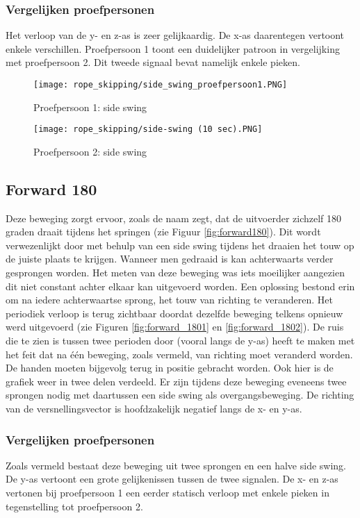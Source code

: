 \subsubsection{Vergelijken proefpersonen}
Het verloop van de y- en z-as is zeer gelijkaardig. De x-as daarentegen vertoont enkele verschillen. Proefpersoon 1 toont een duidelijker patroon in vergelijking met proefpersoon 2. Dit tweede signaal bevat namelijk enkele pieken.

\begin{figure}[!htpd]
\centering
\caption{Proefpersoon 1: side swing}\label{fig:side_swing1}
\texttt{[image: rope\_skipping/side\_swing\_proefpersoon1.PNG]}
\end{figure}

\begin{figure}[!htpd]
\centering
\caption{Proefpersoon 2: side swing}\label{fig:side_swing2}
\texttt{[image: rope\_skipping/side-swing (10 sec).PNG]}
\end{figure}

\subsection{Forward 180}
Deze beweging zorgt ervoor, zoals de naam zegt, dat de uitvoerder zichzelf 180 graden draait tijdens het springen (zie Figuur \ref{fig:forward180}). Dit wordt verwezenlijkt door met behulp van een side swing tijdens het draaien het touw op de juiste plaats te krijgen. Wanneer men gedraaid is kan achterwaarts verder gesprongen worden.
Het meten van deze beweging was iets moeilijker aangezien dit niet constant achter elkaar kan uitgevoerd worden. Een oplossing bestond erin om na iedere achterwaartse sprong, het touw van richting te veranderen. 
Het periodiek verloop is terug zichtbaar doordat dezelfde beweging telkens opnieuw werd uitgevoerd (zie Figuren \ref{fig:forward_1801} en \ref{fig:forward_1802}).
De ruis die te zien is tussen twee perioden door (vooral langs de y-as) heeft te maken met het feit dat na één beweging, zoals vermeld, van richting moet veranderd worden. De handen moeten bijgevolg terug in positie gebracht worden.
Ook hier is de grafiek weer in twee delen verdeeld. Er zijn tijdens deze beweging eveneens twee sprongen nodig met daartussen een side swing als overgangsbeweging.
De richting van de versnellingsvector is hoofdzakelijk negatief langs de x- en y-as. 

\subsubsection{Vergelijken proefpersonen}
Zoals vermeld bestaat deze beweging uit twee sprongen en een halve side swing. De y-as vertoont een grote gelijkenissen tussen de twee signalen. De x- en z-as vertonen bij proefpersoon 1 een eerder statisch verloop met enkele pieken in tegenstelling tot proefpersoon 2. 


